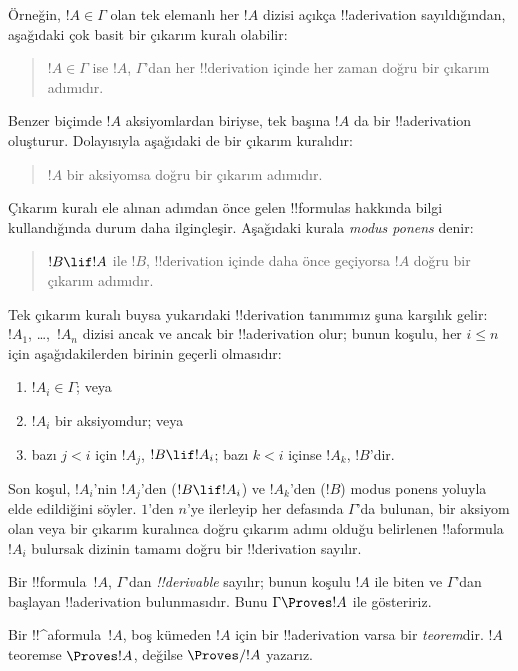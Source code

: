 Örneğin, $!A \in \Gamma$ olan tek elemanlı her $!A$ dizisi açıkça
!!a{derivation} sayıldığından, aşağıdaki çok basit bir çıkarım kuralı olabilir:
\begin{quote}
  $!A \in \Gamma$ ise $!A$, $\Gamma$'dan her !!{derivation} içinde her zaman
  doğru bir çıkarım adımıdır.
\end{quote}
Benzer biçimde $!A$ aksiyomlardan biriyse, tek başına $!A$ da bir
!!a{derivation} oluşturur. Dolayısıyla aşağıdaki de bir çıkarım kuralıdır:
\begin{quote}
  $!A$ bir aksiyomsa doğru bir çıkarım adımıdır.
\end{quote}
Çıkarım kuralı ele alınan adımdan önce gelen !!{formula}s hakkında bilgi kullandığında
durum daha ilginçleşir. Aşağıdaki kurala \emph{modus ponens} denir:
\begin{quote}
  $!B \lif !A$ ile $!B$, !!{derivation} içinde daha önce geçiyorsa $!A$ doğru
  bir çıkarım adımıdır.
\end{quote}
Tek çıkarım kuralı buysa yukarıdaki !!{derivation} tanımımız şuna karşılık
gelir: $!A_1$, \dots,~$!A_n$ dizisi ancak ve ancak bir !!a{derivation} olur;
bunun koşulu, her $i \le n$ için aşağıdakilerden birinin geçerli olmasıdır:
\begin{enumerate}
\item $!A_i \in \Gamma$; veya
\item $!A_i$ bir aksiyomdur; veya
\item bazı $j < i$ için $!A_j$, $!B \lif !A_i$; bazı $k < i$ içinse $!A_k$,
  $!B$'dir.
\end{enumerate}
Son koşul, $!A_i$'nin $!A_j$'den ($!B \lif !A_i$) ve $!A_k$'den ($!B$)
modus ponens yoluyla elde edildiğini söyler. $1$'den $n$'ye ilerleyip her
defasında $\Gamma$'da bulunan, bir aksiyom olan veya bir çıkarım kuralınca
doğru çıkarım adımı olduğu belirlenen !!a{formula}~$!A_i$ bulursak dizinin
tamamı doğru bir !!{derivation} sayılır.

\begin{defn}[!!^{derivability}]
Bir !!{formula}~$!A$, $\Gamma$'dan \emph{!!{derivable}} sayılır; bunun koşulu
$!A$ ile biten ve $\Gamma$'dan başlayan !!a{derivation} bulunmasıdır. Bunu
$\Gamma \Proves !A$ ile gösteririz.
\end{defn}

\begin{defn}[Teoremler]
Bir !!^a{formula}~$!A$, boş kümeden $!A$ için bir !!a{derivation} varsa bir
\emph{teorem}dir. $!A$ teoremse $\Proves !A$, değilse $\Proves/ !A$ yazarız.
\end{defn}

